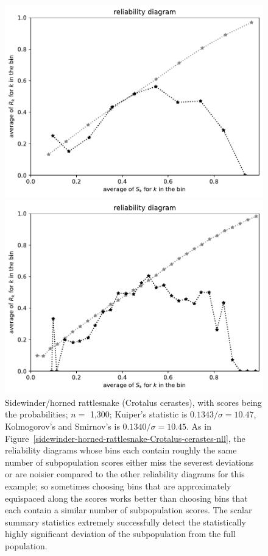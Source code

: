\documentclass{article}
\begin{document}
\begin{figure}
\begin{centering}
\parbox{\imsize}{\includegraphics[width=\imsize]
{./codes/unweighted/prob-1-68-sidewinder-horned-rattlesnake-Crotalus-cerastesequiscore10}}
\quad\quad
\parbox{\imsize}{\includegraphics[width=\imsize]
{./codes/unweighted/prob-1-68-sidewinder-horned-rattlesnake-Crotalus-cerastesequiscore30}}

\end{centering}
\caption{Sidewinder/horned rattlesnake (Crotalus cerastes),
         with scores being the probabilities;
         $n =$ 1,300; Kuiper's statistic is $0.1343 / \sigma = 10.47$,
         Kolmogorov's and Smirnov's is $0.1340 / \sigma = 10.45$.
As in Figure~\ref{sidewinder-horned-rattlesnake-Crotalus-cerastes-nll},
the reliability diagrams whose bins each contain roughly the same number
of subpopulation scores either miss the severest deviations or are noisier
compared to the other reliability diagrams for this example;
so sometimes choosing bins that are approximately equispaced
along the scores works better than choosing bins that each contain
a similar number of subpopulation scores.
The scalar summary statistics extremely successfully
detect the statistically highly significant deviation
of the subpopulation from the full population.
}
\label{sidewinder-horned-rattlesnake-Crotalus-cerastes-prob}
\end{figure}
\end{document}
